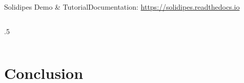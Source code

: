 \documentclass[10pt,compress,serif,aspectratio=169]{beamer}
\begin{document}
\begin{frame}[c]{Solidipes Demo \& Tutorial}{Documentation: \href{https://solidipes.readthedocs.io/en/latest/}{https://solidipes.readthedocs.io}}
\begin{columns}
\begin{column}{.5\textwidth}
			\begin{center}
			\end{center}
			\vspace{.4cm}

			\vspace{.5cm}
		\end{column}
	\end{columns}

\end{frame}



%

\section{Conclusion}
\end{document}
